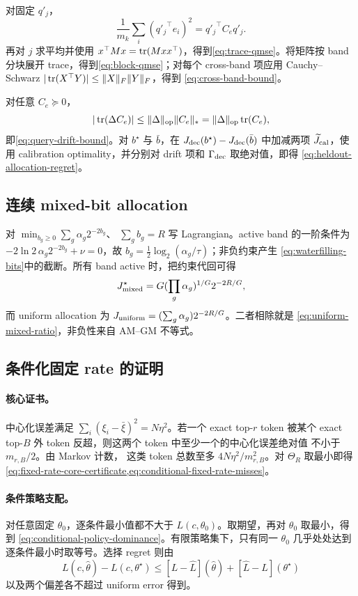 对固定 $q'_j$，
\[
 \frac1{m_k}\sum_i({q'_j}^\top e_i)^2
 ={q'_j}^\top C_eq'_j.
\]
再对 $j$ 求平均并使用
$x^\top Mx=\operatorname{tr}(Mxx^\top)$，得到\cref{eq:trace-qmse}。将矩阵按 band
分块展开 trace，得到\cref{eq:block-qmse}；对每个 cross-band 项应用
Cauchy--Schwarz
$|\operatorname{tr}(X^\top Y)|\le\|X\|_F\|Y\|_F$，得到
\cref{eq:cross-band-bound}。

对任意 $C_e\succeq0$，
\[
 |\operatorname{tr}(\Delta C_e)|
 \le\|\Delta\|_{\mathrm{op}}\|C_e\|_*
 =\|\Delta\|_{\mathrm{op}}\operatorname{tr}(C_e),
\]
即\cref{eq:query-drift-bound}。对 $b^\star$ 与 $\bar b$，在
$J_{\rm dec}(b^\star)-J_{\rm dec}(\bar b)$ 中加减两项
$\widetilde J_{\rm cal}$，使用 calibration optimality，并分别对 drift
项和 $\Gamma_{\rm dec}$ 取绝对值，即得
\cref{eq:heldout-allocation-regret}。

\subsection{连续 mixed-bit allocation}

对
$\min_{b_g\ge0}\sum_g\alpha_g2^{-2b_g}$、
$\sum_gb_g=R$ 写 Lagrangian。active band 的一阶条件为
$-2\ln2\,\alpha_g2^{-2b_g}+\nu=0$，故
$b_g=\frac12\log_2(\alpha_g/\tau)$；非负约束产生
\cref{eq:waterfilling-bits}中的截断。所有 band active 时，把约束代回可得
\[
 J_{\rm mixed}^\star
 =G(\prod_g\alpha_g)^{1/G}2^{-2R/G},
\]
而 uniform allocation 为
$J_{\rm uniform}=(\sum_g\alpha_g)2^{-2R/G}$。二者相除就是
\cref{eq:uniform-mixed-ratio}，非负性来自 AM--GM 不等式。

\subsection{条件化固定 rate 的证明}

\paragraph{核心证书。}
中心化误差满足
$\sum_i(\xi_i-\bar\xi)^2=N\eta^2$。若一个 exact top-$r$ token 被某个
exact top-$B$ 外 token 反超，则这两个 token 中至少一个的中心化误差绝对值
不小于 $m_{r,B}/2$。由 Markov 计数，
这类 token 总数至多 $4N\eta^2/m_{r,B}^2$。对 $\Theta_R$ 取最小即得
\cref{eq:fixed-rate-core-certificate,eq:conditional-fixed-rate-misses}。

\paragraph{条件策略支配。}
对任意固定 $\theta_0$，逐条件最小值都不大于
$L(c,\theta_0)$。取期望，再对 $\theta_0$ 取最小，得到
\cref{eq:conditional-policy-dominance}。有限策略集下，只有同一
$\theta_0$ 几乎处处达到逐条件最小时取等号。选择 regret 则由
\[
 L(c,\widehat\theta)-L(c,\theta^\star)
 \le[L-\widehat L](\widehat\theta)
 +[\widehat L-L](\theta^\star)
\]
以及两个偏差各不超过 uniform error 得到。


